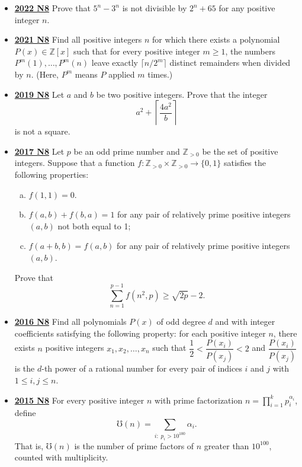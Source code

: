 \documentclass[11pt]{scrartcl}
\begin{document}
\begin{itemize}[leftmargin=*]
    \item  \href{https://artofproblemsolving.com/community/c6h3107338p28104291}{\textbf{2022 N8}} Prove that $5^n-3^n$ is not divisible by $2^n+65$  for any positive integer $n$.
\item  \href{https://artofproblemsolving.com/community/c6h2882533p25627467}{\textbf{2021 N8}} Find all positive integers $n$ for which there exists a polynomial $P(x) \in \mathbb{Z}[x]$ such that for every positive integer $m\geqslant  1$, the numbers $P^m(1), \dots, P^m(n)$ leave exactly $\lceil n/2^m\rceil$ distinct remainders when divided by $n$. (Here, $P^m$ means $P$ applied $m$ times.)
\item  \href{https://artofproblemsolving.com/community/c6h2278989p17828642}{\textbf{2019 N8}} Let $a$ and $b$ be two positive integers. Prove that the integer
\[a^2+\left\lceil\frac{4a^2}b\right\rceil\]is not a square.
\item  \href{https://artofproblemsolving.com/community/c6h1671295p10632363}{\textbf{2017 N8}} Let $p$ be an odd prime number and $\mathbb{Z}_{>0}$ be the set of positive integers. Suppose that a function $f:\mathbb{Z}_{>0}\times\mathbb{Z}_{>0}\to\{0,1\}$ satisfies the following properties:
\begin{enumerate}[(a)]
\item $f(1,1)=0$.
\item $f(a,b)+f(b,a)=1$ for any pair of relatively prime positive integers $(a,b)$ not both equal to 1;
\item $f(a+b,b)=f(a,b)$ for any pair of relatively prime positive integers $(a,b)$.
\end{enumerate}
Prove that
$$\sum_{n=1}^{p-1}f(n^2,p) \geqslant  \sqrt{2p}-2.$$
\item  \href{https://artofproblemsolving.com/community/c6h1480732p8639362}{\textbf{2016 N8}} 	Find all polynomials $P(x)$ of odd degree $d$ and with integer coefficients satisfying the following property: for each positive integer $n$, there exists $n$ positive integers $x_1, x_2, \dots, x_n$ such that $\dfrac12 < \dfrac{P(x_i)}{P(x_j)} < 2$ and $\dfrac{P(x_i)}{P(x_j)}$ is the $d$-th power of a rational number for every pair of indices $i$ and $j$ with $1 \leqslant i, j \leqslant n$.

\newpage

\item  \href{https://artofproblemsolving.com/community/c6h1268921p6622883}{\textbf{2015 N8}} 	For every positive integer $n$ with prime factorization $n = \prod_{i = 1}^{k} p_i^{\alpha_i}$, define
\[\mho(n) = \sum_{i: \; p_i > 10^{100}} \alpha_i.\]That is, $\mho(n)$ is the number of prime factors of $n$ greater than $10^{100}$, counted with multiplicity.


\end{itemize}
\end{document}
